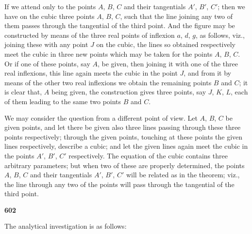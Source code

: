\documentclass[12pt,a4paper]{article}
\theoremstyle{plain}
\begin{document}
If we attend only to the points $A$, $B$, $C$ and their tangentials $A'$, $B'$, $C'$; then we have on the cubic three points $A$, $B$, $C$, such that the line joining any two of them passes through the tangential of the third point. And the figure may be constructed by means of the three real points of inflexion $a$, $d$, $g$, as follows, viz., joining these with any point $J$ on the cubic, the lines so obtained respectively meet the cubic in three new points which may be taken for the points $A$, $B$, $C$. Or if one of these points, say $A$, be given, then joining it with one of the three real inflexions, this line again meets the cubic in the point $J$, and from it by means of the other two real inflexions we obtain the remaining points $B$ and $C$; it is clear that, $A$ being given, the construction gives three points, say $J$, $K$, $L$, each of them leading to the same two points $B$ and $C$.

We may consider the question from a different point of view. Let $A$, $B$, $C$ be given points, and let there be given also three lines passing through these three points respectively; through the given points, touching at these points the given lines respectively, describe a cubic; and let the given lines again meet the cubic in the points $A'$, $B'$, $C'$ respectively. The equation of the cubic contains three arbitrary parameters; but when two of these are properly determined, the points $A$, $B$, $C$ and their tangentials $A'$, $B'$, $C'$ will be related as in the theorem; viz., the line through any two of the points will pass through the tangential of the third point.

\newpage
\noindent\textbf{602}

The analytical investigation is as follows:
\end{document}
